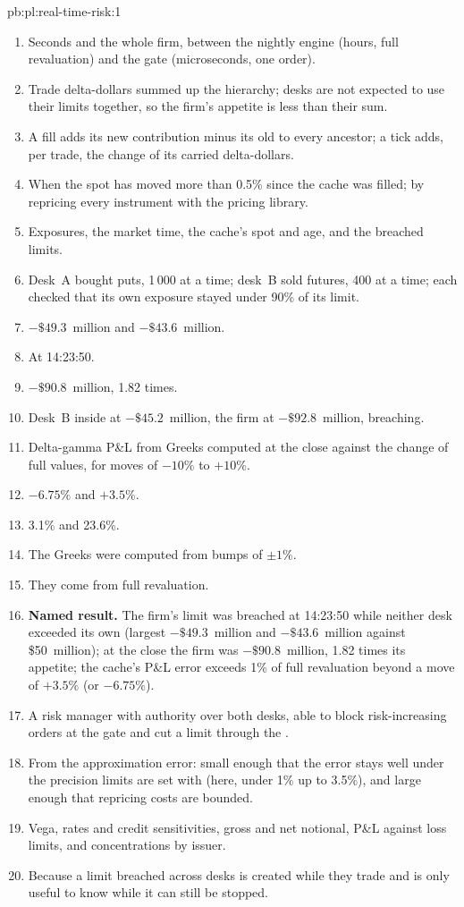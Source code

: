 \begin{solution}{pb:pl:real-time-risk:1}
\begin{enumerate}
\item Seconds and the whole firm, between the nightly engine (hours, full revaluation) and the gate (microseconds, one order).
\item Trade delta-dollars summed up the hierarchy; desks are not expected to use their limits together, so the firm's appetite is less than
their sum.
\item A fill adds its new contribution minus its old to every ancestor; a tick adds, per trade, the change of its carried delta-dollars.
\item When the spot has moved more than 0.5\% since the cache was filled; by repricing every instrument with the pricing library.
\item Exposures, the market time, the cache's spot and age, and the breached limits.
\item Desk~A bought puts, 1\,000 at a time; desk~B sold futures, 400 at a time; each checked that its own exposure stayed under 90\% of its limit.
\item $-\$49.3$~million and $-\$43.6$~million.
\item At 14:23:50.
\item $-\$90.8$~million, 1.82 times.
\item Desk~B inside at $-\$45.2$~million, the firm at $-\$92.8$~million, breaching.
\item Delta-gamma P\&L from Greeks computed at the close against the change of full values, for moves of $-10\%$ to $+10\%$.
\item $-6.75\%$ and $+3.5\%$.
\item 3.1\% and 23.6\%.
\item The Greeks were computed from bumps of $\pm1\%$.
\item They come from full revaluation.
\item \textbf{Named result.} The firm's limit was breached at 14:23:50 while neither desk exceeded its own (largest $-\$49.3$~million and
$-\$43.6$~million against \$50~million); at the close the firm was $-\$90.8$~million, 1.82 times its appetite; the cache's P\&L error exceeds
1\% of full revaluation beyond a move of $+3.5\%$ (or $-6.75\%$).
\item A risk manager with authority over both desks, able to block risk-increasing orders at the gate and cut a limit through the .
\item From the approximation error: small enough that the error stays well under the precision limits are set with (here, under 1\% up to 3.5\%),
and large enough that repricing costs are bounded.
\item Vega, rates and credit sensitivities, gross and net notional, P\&L against loss limits, and concentrations by issuer.
\item Because a limit breached across desks is created while they trade and is only useful to know while it can still be stopped.
\end{enumerate}
\end{solution}


